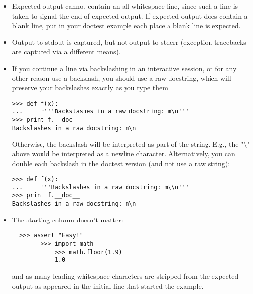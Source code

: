 \begin{itemize}

\item Expected output cannot contain an all-whitespace line, since such a
  line is taken to signal the end of expected output.  If expected
  output does contain a blank line, put  in your
  doctest example each place a blank line is expected.

\item Output to stdout is captured, but not output to stderr (exception
  tracebacks are captured via a different means).

\item If you continue a line via backslashing in an interactive session,
  or for any other reason use a backslash, you should use a raw
  docstring, which will preserve your backslashes exactly as you type
  them:

\begin{verbatim}
>>> def f(x):
...     r'''Backslashes in a raw docstring: m\n'''
>>> print f.__doc__
Backslashes in a raw docstring: m\n
\end{verbatim}

  Otherwise, the backslash will be interpreted as part of the string.
  E.g., the "{\textbackslash}" above would be interpreted as a newline
  character.  Alternatively, you can double each backslash in the
  doctest version (and not use a raw string):

\begin{verbatim}
>>> def f(x):
...     '''Backslashes in a raw docstring: m\\n'''
>>> print f.__doc__
Backslashes in a raw docstring: m\n
\end{verbatim}

\item The starting column doesn't matter:

\begin{verbatim}
  >>> assert "Easy!"
        >>> import math
            >>> math.floor(1.9)
            1.0
\end{verbatim}

and as many leading whitespace characters are stripped from the
expected output as appeared in the initial  line
that started the example.
\end{itemize}

